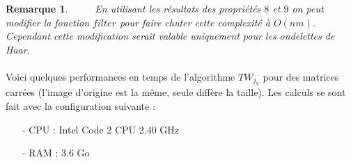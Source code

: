 \documentclass[a4paper,10pt]{report}
\theoremstyle{break}
\newtheorem{Rem}{Remarque}
\begin{document}
    \begin{Rem}
      $\phantom{Prop}$ En utilisant les r\'{e}sultats des propri\'{e}t\'{e}s $8$ et $9$ on peut modifier la fonction $filter$ 
      pour faire chuter cette complexit\'{e} \`{a} $ O(nm) $. Cependant cette modification serait valable uniquement pour les
      ondelettes de Haar.
    \end{Rem}

    
\newpage

    \paragraph{} Voici quelques performances en temps de l'algorithme $TW_{j_V}$ pour des matrices carr\'{e}es 
      (l'image d'origine est la m\^{e}me, seule diff\`{e}re la taille). 
      Les calculs se sont fait avec la configuration suivante :
      \begin{itemize}
       \item[-] CPU : Intel Code 2 CPU 2.40 GHz
       \item[-] RAM : 3.6 Go
      \end{itemize}
\end{document}
